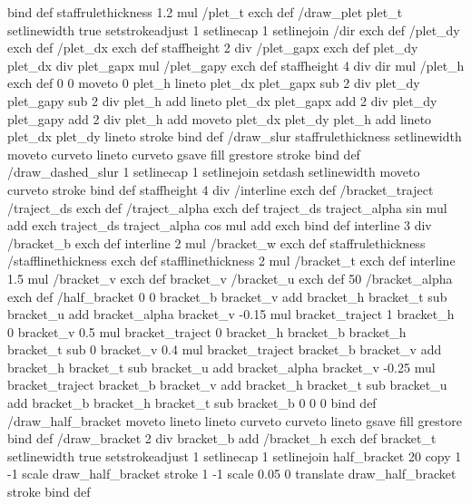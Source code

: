{{{ } bind def
staffrulethickness 1.2 mul /plet_t exch def
/draw_plet
{
	plet_t setlinewidth
	true setstrokeadjust
	1 setlinecap
	1 setlinejoin
	/dir exch def
	/plet_dy exch def
	/plet_dx exch def
	staffheight 2 div /plet_gapx exch def
	plet_dy plet_dx div plet_gapx mul /plet_gapy exch def
	staffheight 4 div dir mul /plet_h exch def
%
	0 0 moveto
	0 plet_h lineto 
	plet_dx plet_gapx sub 2 div 
		plet_dy plet_gapy sub 2 div plet_h add lineto
	plet_dx plet_gapx add 2 div 
		plet_dy plet_gapy add 2 div plet_h add moveto
	plet_dx plet_dy plet_h add lineto
	plet_dx plet_dy lineto
	stroke
} bind def
%
/draw_slur
{
	staffrulethickness setlinewidth
	moveto
	curveto
	lineto
	curveto
	gsave
	fill
	grestore
	stroke
} bind def
%
/draw_dashed_slur
{
	1 setlinecap
	1 setlinejoin
	setdash
	setlinewidth
	moveto
	curveto
	stroke
} bind def
%
staffheight 4 div /interline exch def
%
/bracket_traject
{
  /traject_ds exch def
  /traject_alpha exch def
  traject_ds traject_alpha sin mul add
  exch
  traject_ds traject_alpha cos mul add
  exch
} bind def
%
interline 3 div /bracket_b exch def
interline 2 mul /bracket_w exch def
staffrulethickness /stafflinethickness exch def
stafflinethickness 2 mul /bracket_t exch def
interline 1.5 mul /bracket_v exch def
bracket_v /bracket_u exch def
50 /bracket_alpha exch def
%
/half_bracket
{
	0 0
	bracket_b bracket_v add bracket_h bracket_t sub bracket_u add
	bracket_alpha bracket_v -0.15 mul bracket_traject
	1 bracket_h
	0 bracket_v 0.5 mul bracket_traject
	0 bracket_h
	bracket_b bracket_h bracket_t sub
	0 bracket_v 0.4 mul bracket_traject
	bracket_b bracket_v add bracket_h bracket_t sub bracket_u add
	bracket_alpha bracket_v -0.25 mul bracket_traject
	bracket_b bracket_v add bracket_h bracket_t sub bracket_u add
	bracket_b bracket_h bracket_t sub
	bracket_b 0
	0 0
} bind def
%
/draw_half_bracket {
	moveto
	lineto
	lineto
	curveto
	curveto
	lineto
	gsave
	fill
	grestore
} bind def
%
/draw_bracket
{
	2 div bracket_b add /bracket_h exch def
	bracket_t setlinewidth
	true setstrokeadjust
	1 setlinecap
	1 setlinejoin
	half_bracket
	20 copy
	1 -1 scale
	draw_half_bracket
	stroke
	1 -1 scale
	0.05 0 translate
	draw_half_bracket
	stroke
} bind def
}}

\def\turnOnExperimentalFeatures{%
\special{ps:
}}

